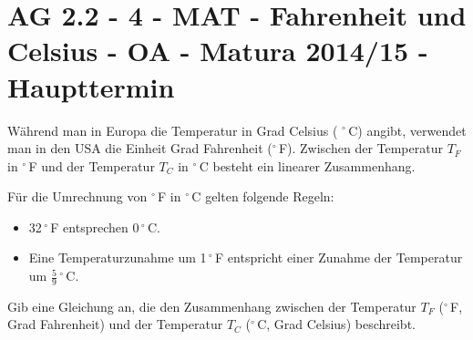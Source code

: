 \section{AG 2.2 - 4 - MAT - Fahrenheit und Celsius - OA - Matura 2014/15 - Haupttermin}

\begin{beispiel}[AG 2.2]{1} %
Während man in Europa die Temperatur in Grad Celsius (
$^\circ$\,C) angibt, verwendet man in den USA
die Einheit Grad Fahrenheit ($^\circ$\,F). Zwischen der Temperatur $T_F$ in $^\circ$\,F und der Temperatur $T_C$ in $^\circ$\,C besteht ein linearer Zusammenhang. \leer

Für die Umrechnung von $^\circ$\,F in $^\circ$\,C gelten folgende Regeln:
\begin{itemize}
	\item 32\,$^\circ$\,F entsprechen 0\,$^\circ$\,C.
	\item Eine Temperaturzunahme um 1\,$^\circ$\,F entspricht einer Zunahme der Temperatur um $\frac{5}{9}$\,$^\circ$\,C. 
\end{itemize}

Gib eine Gleichung an, die den Zusammenhang zwischen der Temperatur $T_F$ ($^\circ$\,F, Grad Fahrenheit) und der Temperatur $T_C$ ($^\circ$\,C, Grad Celsius) beschreibt.


\end{beispiel}